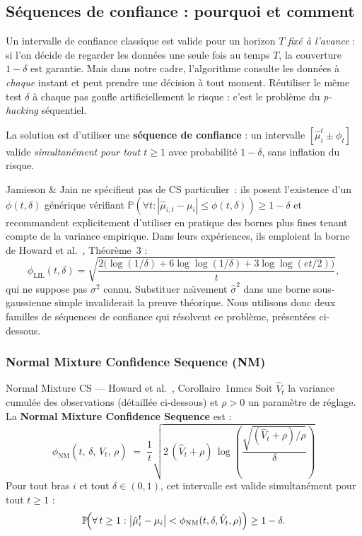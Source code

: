 \documentclass[10.5pt,a4paper]{article}
\newcommand{\Prob}{\mathbb{P}}
\newcommand{\muhat}{\hat{\mu}}
\newcommand{\sigsq}{\sigma^2}
\newcommand{\phil}{\phi_{\mathrm{LIL}}}
\newcommand{\phinm}{\phi_{\mathrm{NM}}}
\begin{document}
\subsection{S\'equences de confiance : pourquoi et comment}

\begin{intuition}
Un intervalle de confiance classique est valide pour un horizon $T$
\emph{fix\'e \`a l'avance} : si l'on d\'ecide de regarder les donn\'ees
une seule fois au temps $T$, la couverture $1-\delta$ est garantie.
Mais dans notre cadre, l'algorithme consulte les donn\'ees \`a \emph{chaque}
instant et peut prendre une d\'ecision \`a tout moment. R\'eutiliser le
m\^eme test $\delta$ \`a chaque pas gonfle artificiellement le risque :
c'est le probl\`eme du \emph{p-hacking} s\'equentiel.

La solution est d'utiliser une \textbf{s\'equence de confiance} : un
intervalle $[\muhat_i^t \pm \phi_t]$ valide \emph{simultan\'ement pour
tout $t \geq 1$} avec probabilit\'e $1-\delta$, sans inflation du risque.
\end{intuition}

Jamieson \& Jain ne sp\'ecifient pas de CS particulier~: ils posent
l'existence d'un $\phi(t,\delta)$ g\'en\'erique v\'erifiant
$\mathbb{P}(\forall t : |\hat{\mu}_{i,t} - \mu_i| \leq \phi(t,\delta)) \geq 1-\delta$
et recommandent explicitement d'utiliser en pratique des bornes plus fines
tenant compte de la variance empirique. Dans leurs exp\'eriences, ils
emploient la borne de Howard et al.~\cite{howard2021}, Théorème~3 :
\[
  \phil(t, \delta) = \sqrt{\frac{2\bigl(\log(1/\delta)
    + 6\log\log(1/\delta) + 3\log\log(et/2)\bigr)}{t}},
\]
qui ne suppose pas $\sigsq$ connu. Substituer na\"\i vement
$\hat{\sigma}^2$ dans une borne sous-gaussienne simple invaliderait la
preuve th\'eorique. Nous utilisons donc deux familles de s\'equences de
confiance qui r\'esolvent ce probl\`eme, pr\'esent\'ees ci-dessous.

\subsubsection{Normal Mixture Confidence Sequence (NM)}

\begin{definition}{Normal Mixture CS --- Howard et al.~\cite{howard2021}, Corollaire~1}{nmcs}
Soit $\hat{V}_t$ la variance cumul\'ee des observations (d\'etaill\'ee
ci-dessous) et $\rho > 0$ un param\`etre de r\'eglage. La
\textbf{Normal Mixture Confidence Sequence} est :
\[
  \boxed{
  \phinm(t,\,\delta,\,\hat{V}_t,\,\rho)
  \;=\;
  \frac{1}{t}\sqrt{2\,(\hat{V}_t+\rho)\,
    \log\!\left(\frac{\sqrt{(\hat{V}_t+\rho)/\rho}}{\delta}\right)}
  }
\]
Pour tout bras $i$ et tout $\delta \in (0,1)$, cet intervalle est
valide simultan\'ement pour tout $t \geq 1$ :
\[
  \Prob\!\Bigl(\forall\, t \geq 1 :
    \bigl|\muhat_i^t - \mu_i\bigr| < \phinm(t,\delta,\hat{V}_t,\rho)
  \Bigr) \geq 1 - \delta.
\]
\end{definition}
\end{document}

